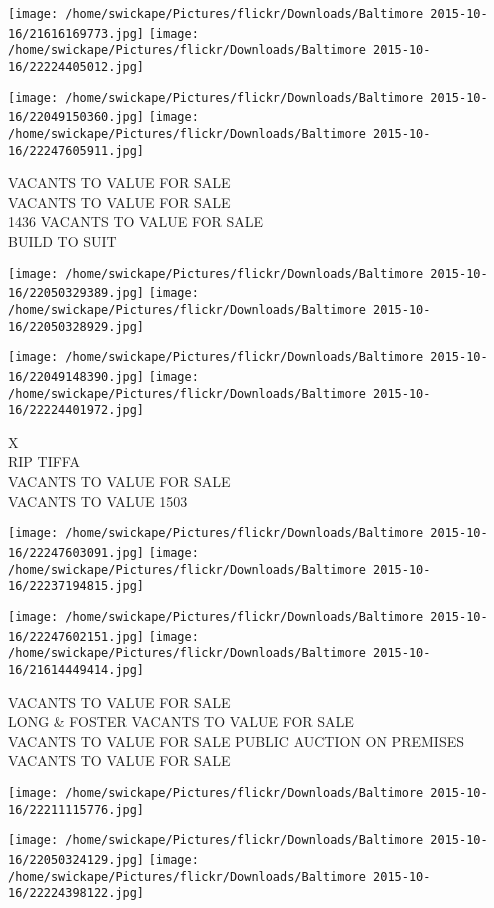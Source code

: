 \documentclass[10pt,letterpaper]{article}
\begin{document}
\texttt{[image: /home/swickape/Pictures/flickr/Downloads/Baltimore 2015-10-16/21616169773.jpg]}
\texttt{[image: /home/swickape/Pictures/flickr/Downloads/Baltimore 2015-10-16/22224405012.jpg]}

\texttt{[image: /home/swickape/Pictures/flickr/Downloads/Baltimore 2015-10-16/22049150360.jpg]}
\texttt{[image: /home/swickape/Pictures/flickr/Downloads/Baltimore 2015-10-16/22247605911.jpg]}

VACANTS TO VALUE FOR SALE\\
VACANTS TO VALUE FOR SALE\\
1436 VACANTS TO VALUE FOR SALE\\
BUILD TO SUIT
\pagebreak

\texttt{[image: /home/swickape/Pictures/flickr/Downloads/Baltimore 2015-10-16/22050329389.jpg]}
\texttt{[image: /home/swickape/Pictures/flickr/Downloads/Baltimore 2015-10-16/22050328929.jpg]}

\texttt{[image: /home/swickape/Pictures/flickr/Downloads/Baltimore 2015-10-16/22049148390.jpg]}
\texttt{[image: /home/swickape/Pictures/flickr/Downloads/Baltimore 2015-10-16/22224401972.jpg]}

X\\
RIP TIFFA\\
VACANTS TO VALUE FOR SALE\\
VACANTS TO VALUE 1503
\pagebreak

\texttt{[image: /home/swickape/Pictures/flickr/Downloads/Baltimore 2015-10-16/22247603091.jpg]}
\texttt{[image: /home/swickape/Pictures/flickr/Downloads/Baltimore 2015-10-16/22237194815.jpg]}

\texttt{[image: /home/swickape/Pictures/flickr/Downloads/Baltimore 2015-10-16/22247602151.jpg]}
\texttt{[image: /home/swickape/Pictures/flickr/Downloads/Baltimore 2015-10-16/21614449414.jpg]}

VACANTS TO VALUE FOR SALE\\
LONG \& FOSTER VACANTS TO VALUE FOR SALE\\
VACANTS TO VALUE FOR SALE PUBLIC AUCTION ON PREMISES\\
VACANTS TO VALUE FOR SALE
\pagebreak

\texttt{[image: /home/swickape/Pictures/flickr/Downloads/Baltimore 2015-10-16/22211115776.jpg]}

\vspace{0.25in}
\texttt{[image: /home/swickape/Pictures/flickr/Downloads/Baltimore 2015-10-16/22050324129.jpg]}
\texttt{[image: /home/swickape/Pictures/flickr/Downloads/Baltimore 2015-10-16/22224398122.jpg]}
\end{document}
